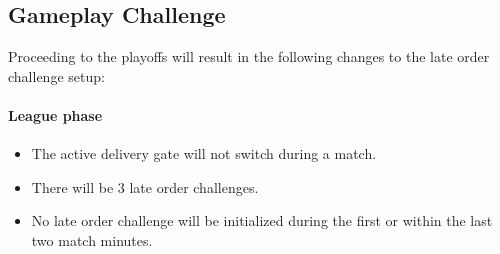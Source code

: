 \documentclass[12pt,twoside]{article}
\begin{document}
\subsection{Gameplay Challenge}
Proceeding to the playoffs will result in the following changes to the
late order challenge setup:

\paragraph{League phase}
\begin{itemize}
\item The active delivery gate will not switch during a match.
\item There will be 3 late order challenges.
\item No late order challenge will be initialized during the first or within the
  last two match minutes.
\end{itemize} 
\end{document}
